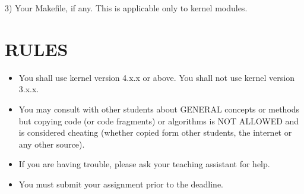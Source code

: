 \documentclass{article}
\begin{document}
3) Your Makefile, if any. This is applicable only to kernel modules.


\section*{RULES}

\begin{itemize}
    \item You shall use kernel version 4.x.x or above. You shall not use kernel version 3.x.x.
    \item You may consult with other students about GENERAL concepts or methods but copying code (or code fragments) or algorithms is NOT ALLOWED and is considered cheating (whether copied form other students, the internet or any other source).
    \item If you are having trouble, please ask your teaching assistant for help.
    \item You must submit your assignment prior to the deadline.
\end{itemize}
\end{document}
